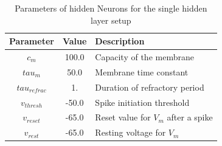   \begin{table}[htpb]
  \centering
  \caption[Parameters 2.Setup]{Parameters of hidden Neurons for the single hidden layer setup} \label{tab:M1hiddenN}
    \begin{tabular}{|c| c |l|}
      \toprule
      Parameter & Value & Description \\
      \midrule
      $c_m$   & 100.0  & Capacity of the membrane \\
      $tau_{m}$    & 50.0  & Membrane time constant \\
      $tau_{refrac}$   & 1.  & Duration of refractory period\\
      $v_{thresh}$   & -50.0  & Spike initiation threshold \\
      $v_{reset}$    & -65.0  &  Reset value for $V_m$ after a spike \\
      $v_{rest}$ & -65.0 & Resting voltage for $V_m$ \\
      \bottomrule
    \end{tabular}
  \end{table}

